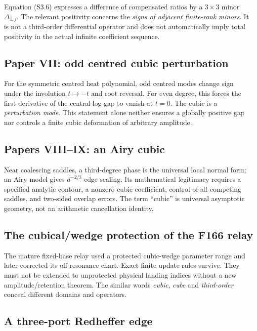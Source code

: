 \documentclass[
  10pt,
  a4paper,
  10pt,
  oneside,
  openany]{book}
\begin{document}
Equation (S3.6) expresses a difference of compensated ratios by a
\(3\times3\) minor \(\Delta_{1,j}\). The relevant positivity concerns
the \emph{signs of adjacent finite-rank minors}. It is not a third-order
differential operator and does not automatically imply total positivity
in the actual infinite coefficient sequence.

\subsection{Paper VII: odd centred cubic
perturbation}\label{paper-vii-odd-centred-cubic-perturbation}

For the symmetric centred heat polynomial, odd centred modes change sign
under the involution \(t\mapsto-t\) and root reversal. For even degree,
this forces the first derivative of the central log gap to vanish at
\(t=0\). The cubic is a \emph{perturbation mode}. This statement alone
neither ensures a globally positive gap nor controls a finite cubic
deformation of arbitrary amplitude.

\subsection{Papers VIII--IX: an Airy
cubic}\label{papers-viiiix-an-airy-cubic}

Near coalescing saddles, a third-degree phase is the universal local
normal form; an Airy model gives \(d^{-2/3}\) edge scaling. Its
mathematical legitimacy requires a specified analytic contour, a nonzero
cubic coefficient, control of all competing saddles, and two-sided
overlap errors. The term ``cubic'' is universal asymptotic geometry, not
an arithmetic cancellation identity.

\subsection{The cubical/wedge protection of the F166
relay}\label{the-cubicalwedge-protection-of-the-f166-relay}

The mature fixed-base relay used a protected cubic-wedge parameter range
and later corrected its off-resonance chart. Exact finite update rules
survive. They must not be extended to unprotected physical landing
indices without a new amplitude/retention theorem. The similar words
\emph{cubic}, \emph{cube} and \emph{third-order} conceal different
domains and operators.

\subsection{A three-port Redheffer
edge}\label{a-three-port-redheffer-edge}
\end{document}
